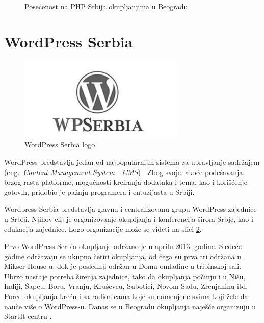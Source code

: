 \documentclass[a4paper]{article}
\begin{document}
{\begin{figure}
\caption{Posećenost na PHP Srbija okupljanjima u Beogradu}
\label{fig:PHPgrafik}
\end{figure}

\section{WordPress Serbia}
\begin{figure}[H]
\begin{center}
\includegraphics[scale=0.5]{wp.jpg}
\end{center}
\caption{WordPress Serbia logo}
\label{fig:wordpressLogo}
\end{figure}
WordPress predstavlja jedan od najpopularnijih sistema za upravljanje sadržajem (eng.~{\em Content Management System - CMS}) \cite{isitwp}. Zbog svoje lakoće podešavanja, brzog rasta platforme, mogućnosti kreiranja dodataka i tema, kao i korišćenje gotovih, pridobio je pažnju programera i entuzijasta u Srbiji. 

Wordpress Serbia predstavlja glavnu i centralizovanu grupu WordPress zajednice u Srbiji. Njihov cilj je organizovanje okupljanja i konferencija širom Srbje, kao i edukacija zajednice. Logo organizacije može se videti na slici \ref{fig:wordpressLogo}.

Prvo WordPress Serbia okupljanje održano je u aprilu 2013. godine. Sledeće godine održavaju se ukupno četiri okupljanja, od čega su prva tri održana u Mikser House-u, dok je poslednji održan u Domu omladine u tribinskoj sali. Ubrzo nastaje potreba širenja zajednice, tako da okupljanja počinju i u Nišu, Inđiji, Šapcu, Boru, Vranju, Kruševcu, Subotici, Novom Sadu, Zrenjaninu itd. Pored okupljanja kreću i sa radionicama koje su namenjene svima koji žele da nauče više o WordPress-u. Danas se u Beogradu okupljanja naješće organizuju u StartIt centru \cite{aboutStarit}.

}
\end{document}
